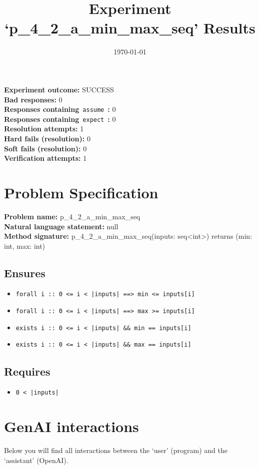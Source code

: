 \documentclass{article}
\begin{document}
\title{Experiment `p\_4\_2\_a\_min\_max\_seq' Results}
\author{\today}
\date{}
\maketitle
\textbf{Experiment outcome: }SUCCESS
\\\textbf{Bad responses: }0
\\\textbf{Responses containing}~\texttt{assume}~\textbf{: }0
\\\textbf{Responses containing}~\texttt{expect}~\textbf{: }0
\\\textbf{Resolution attempts: }1
\\\textbf{Hard fails (resolution): }0
\\\textbf{Soft fails (resolution): }0
\\\textbf{Verification attempts: }1
\section*{Problem Specification}
\textbf{Problem name: }p\_4\_2\_a\_min\_max\_seq
\\\textbf{Natural language statement: }null
\\\textbf{Method signature: }p\_4\_2\_a\_min\_max\_seq(inputs: seq<int>) returns (min: int, max: int)
\subsection*{Ensures}
\begin{itemize}
\item \texttt{forall i :: 0 <= i < |inputs| ==> min <= inputs[i]}
\item \texttt{forall i :: 0 <= i < |inputs| ==> max >= inputs[i]}
\item \texttt{exists i :: 0 <= i < |inputs| \&\& min == inputs[i]}
\item \texttt{exists i :: 0 <= i < |inputs| \&\& max == inputs[i]}
\end{itemize}
\subsection*{Requires}
\begin{itemize}
\item \texttt{0 < |inputs|}
\end{itemize}
\clearpage
\section*{GenAI interactions}
Below you will find all interactions between the `user' (program) and the `assistant' (OpenAI).
\end{document}

